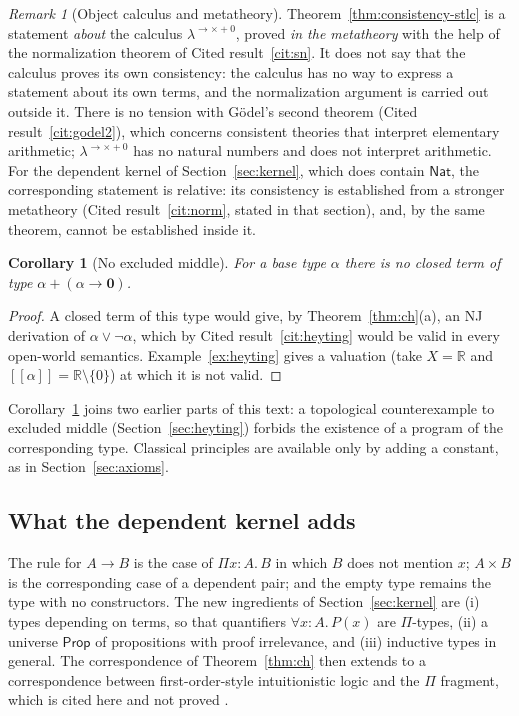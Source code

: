 \documentclass[11pt]{article}
\newcommand{\sem}[1]{[\![#1]\!]}
\newcommand{\Prop}{\mathsf{Prop}}
\theoremstyle{definition}
\theoremstyle{plain}
\newtheorem{corollary}[definition]{Corollary}
\theoremstyle{remark}
\newtheorem{remark}[definition]{Remark}
\begin{document}
\begin{remark}[Object calculus and metatheory]\label{rem:objmeta}
Theorem~\ref{thm:consistency-stlc} is a statement \emph{about} the calculus $\lambda^{\to\times+0}$, proved \emph{in the metatheory} with the help of the normalization theorem of Cited result~\ref{cit:sn}. It does not say that the calculus proves its own consistency: the calculus has no way to express a statement about its own terms, and the normalization argument is carried out outside it. There is no tension with G\"odel's second theorem (Cited result~\ref{cit:godel2}), which concerns consistent theories that interpret elementary arithmetic; $\lambda^{\to\times+0}$ has no natural numbers and does not interpret arithmetic. For the dependent kernel of Section~\ref{sec:kernel}, which does contain $\mathsf{Nat}$, the corresponding statement is relative: its consistency is established from a stronger metatheory (Cited result~\ref{cit:norm}, stated in that section), and, by the same theorem, cannot be established inside it.
\end{remark}

\begin{corollary}[No excluded middle]\label{cor:no-em}
For a base type $\alpha$ there is no closed term of type $\alpha+(\alpha\to\mathbf 0)$.
\end{corollary}
\begin{proof}
A closed term of this type would give, by Theorem~\ref{thm:ch}(a), an NJ derivation of $\alpha\vee\neg\alpha$, which by Cited result~\ref{cit:heyting} would be valid in every open-world semantics. Example~\ref{ex:heyting} gives a valuation (take $X=\mathbb{R}$ and $\sem\alpha=\mathbb{R}\setminus\{0\}$) at which it is not valid.
\end{proof}

Corollary~\ref{cor:no-em} joins two earlier parts of this text: a topological counterexample to excluded middle (Section~\ref{sec:heyting}) forbids the existence of a program of the corresponding type. Classical principles are available only by adding a constant, as in Section~\ref{sec:axioms}.

\subsection{What the dependent kernel adds}

The rule for $A\to B$ is the case of $\Pi x{:}A.\,B$ in which $B$ does not mention $x$; $A\times B$ is the corresponding case of a dependent pair; and the empty type remains the type with no constructors. The new ingredients of Section~\ref{sec:kernel} are (i) types depending on terms, so that quantifiers $\forall x{:}A.\,P(x)$ are $\Pi$-types, (ii) a universe $\Prop$ of propositions with proof irrelevance, and (iii) inductive types in general. The correspondence of Theorem~\ref{thm:ch} then extends to a correspondence between first-order-style intuitionistic logic and the $\Pi$ fragment, which is cited here and not proved \cite{Howard80,Martin-Lof84}.
\end{document}
